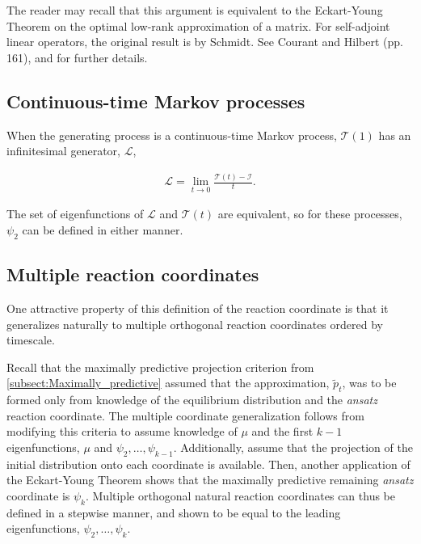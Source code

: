 \documentclass[aip, jcp, reprint, nolinenumbers, twocolumn, nobalancelastpage, nofootinbib]{revtex4-1}
\begin{document}
The reader may recall that this argument is equivalent to the Eckart-Young Theorem on the optimal low-rank approximation of a matrix.\cite{eckart1936approximation} For self-adjoint linear operators, the original result is by Schmidt.\cite{schmidt1907zur} See Courant and Hilbert (pp. 161),\cite{courant2008methods} and \citet{micchelli1971some} for further details.

\subsection{Continuous-time Markov processes}

When the generating process is a continuous-time Markov process, $\mathcal{T}(1)$ has an infinitesimal generator, $\mathcal{L}$,

\begin{align}
\mathcal{L} = \lim_{t\rightarrow 0} \frac{\mathcal{T}(t) - \mathcal{I}}{t}.
\end{align}

The set of eigenfunctions of $\mathcal{L}$ and $\mathcal{T}(t)$ are equivalent, so for these processes, $\psi_2$ can be defined in either manner.

\subsection{Multiple reaction coordinates}
\label{subsect:multiple_reaction_coordinates}
One attractive property of this definition of the reaction coordinate is that it generalizes naturally to multiple orthogonal reaction coordinates ordered by timescale.

Recall that the maximally predictive projection criterion from \cref{subsect:Maximally_predictive} assumed that the approximation, $\tilde{p}_t$, was to be formed only from knowledge of the equilibrium distribution and the \emph{ansatz} reaction coordinate. The multiple coordinate generalization follows from modifying this criteria to assume knowledge of $\mu$ and the first $k-1$ eigenfunctions, $\mu$ and $\psi_2, \ldots, \psi_{k-1}$. Additionally, assume that the projection of the initial distribution onto each coordinate is available. Then, another application of the Eckart-Young Theorem shows that the maximally predictive remaining \emph{ansatz} coordinate is $\psi_{k}$. Multiple orthogonal natural reaction coordinates can thus be defined in a stepwise manner, and shown to be equal to the leading eigenfunctions, $\psi_2, \ldots, \psi_k$.
\end{document}
